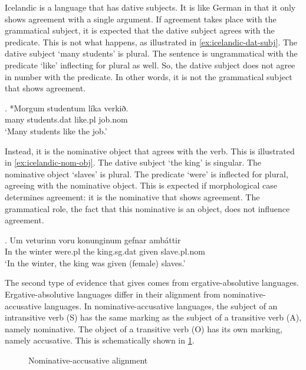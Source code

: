 Icelandic is a language that has dative subjects. It is like German in that it only shows agreement with a single argument. If agreement takes place with the grammatical subject, it is expected that the dative subject agrees with the predicate. This is not what happens, as illustrated in \ref{ex:icelandic-dat-subj}. The dative subject  `many students' is plural. The sentence is ungrammatical with the predicate  `like' inflecting for plural as well. So, the dative subject does not agree in number with the predicate. In other words, it is not the grammatical subject that shows agreement.

\exg. *Morgum studentum líka verkið.\\
 many students.\ac{dat} like.\ac{pl} job.\ac{nom} \\
`Many students like the job.' \label{ex:icelandic-dat-subj}

Instead, it is the nominative object that agrees with the verb. This is illustrated in \ref{ex:icelandic-nom-obj}. The dative subject  `the king' is singular. The nominative object  `slaves' is plural. The predicate  `were' is inflected for plural, agreeing with the nominative object. This is expected if morphological case determines agreement: it is the nominative that shows agreement. The grammatical role, the fact that this nominative is an object, does not influence agreement.

\exg. Um veturinn voru konunginum gefnar ambáttir\\
In {the winter} were.\ac{pl} {the king}.\ac{sg}.\ac{dat} given slave.\ac{pl}.\ac{nom}\\
`In the winter, the king was given (female) slaves.' \label{ex:icelandic-nom-obj}

The second type of evidence that \citeauthor{bobaljik2006} gives comes from ergative-absolutive languages. Ergative-absolutive languages differ in their alignment from nominative-accusative languages. In nominative-accusative languages, the subject of an intransitive verb (S) has the same marking as the subject of a transitive verb (A), namely nominative. The object of a transitive verb (O) has its own marking, namely accusative. This is schematically shown in \ref{fig:nom-acc-lang}.

\begin{figure}[H]
  \centering
  \caption{Nominative-accusative alignment}
  \label{fig:nom-acc-lang}
\end{figure}


